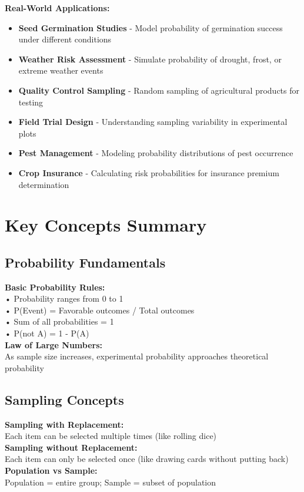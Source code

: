 \documentclass[11pt,a4paper]{article}
\begin{document}
\begin{infobox}
\textbf{Real-World Applications:}
\begin{itemize}
    \item \textbf{Seed Germination Studies} - Model probability of germination success under different conditions
    \item \textbf{Weather Risk Assessment} - Simulate probability of drought, frost, or extreme weather events
    \item \textbf{Quality Control Sampling} - Random sampling of agricultural products for testing
    \item \textbf{Field Trial Design} - Understanding sampling variability in experimental plots
    \item \textbf{Pest Management} - Modeling probability distributions of pest occurrence
    \item \textbf{Crop Insurance} - Calculating risk probabilities for insurance premium determination
\end{itemize}
\end{infobox}

\section{Key Concepts Summary}

\subsection{Probability Fundamentals}

\begin{probabilitybox}
\textbf{Basic Probability Rules:}\\
• Probability ranges from 0 to 1\\
• P(Event) = Favorable outcomes / Total outcomes\\
• Sum of all probabilities = 1\\
• P(not A) = 1 - P(A)\\[0.3cm]
\textbf{Law of Large Numbers:}\\
As sample size increases, experimental probability approaches theoretical probability
\end{probabilitybox}

\subsection{Sampling Concepts}

\begin{probabilitybox}
\textbf{Sampling with Replacement:}\\
Each item can be selected multiple times (like rolling dice)\\[0.3cm]
\textbf{Sampling without Replacement:}\\
Each item can only be selected once (like drawing cards without putting back)\\[0.3cm]
\textbf{Population vs Sample:}\\
Population = entire group; Sample = subset of population
\end{probabilitybox}
\end{document}
